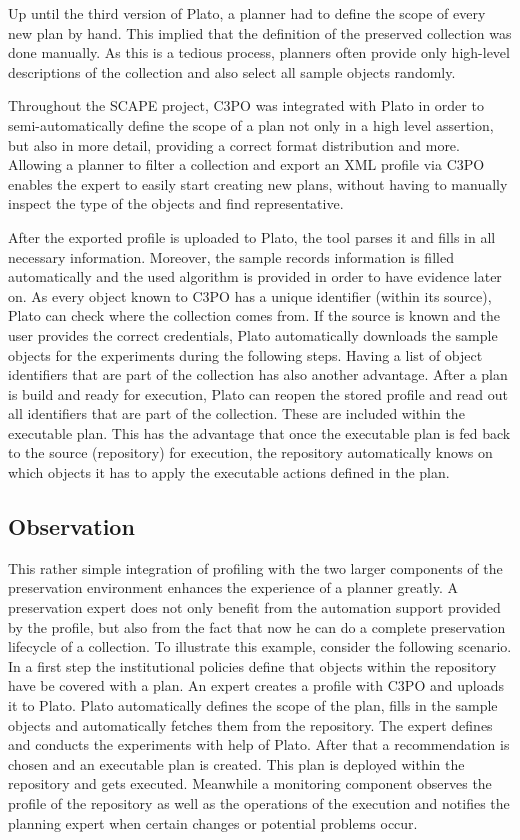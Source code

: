 Up until the third version of Plato, a planner had to define the scope of every new plan by hand. This implied that the definition of the preserved collection was done manually. As this is a tedious process, planners often provide only high-level descriptions of the collection and also select all sample objects randomly.

Throughout the SCAPE project, C3PO was integrated with Plato in order to semi-automatically define the scope of a plan not only in a high level assertion, but also in more detail, providing a correct format distribution and more.
Allowing a planner to filter a collection and export an XML profile via C3PO enables the expert to easily start creating new plans, without having to manually inspect the type of the objects and find representative.

After the exported profile is uploaded to Plato, the tool parses it and fills in all necessary information. Moreover, the sample records information is filled automatically and the used algorithm is provided in order to have evidence later on.
As every object known to C3PO has a unique identifier (within its source), Plato can check where the collection comes from. If the source is known and the user provides the correct credentials, Plato automatically downloads the sample objects for the experiments during the following steps.
Having a list of object identifiers that are part of the collection has also another advantage. After a plan is build and ready for execution, Plato can reopen the stored profile and read out all identifiers that are part of the collection. These are included within the executable plan. This has the advantage that once the executable plan is fed back to the source (repository) for execution, the repository automatically knows on which objects it has to apply the executable actions defined in the plan.

\subsection{Observation}
This rather simple integration of profiling with the two larger components of the preservation environment  enhances the experience of a planner greatly. A preservation expert does not only benefit from the automation support provided by the profile, but also from the fact that now he can do a complete preservation lifecycle of a collection. To illustrate this example, consider the following scenario. In a first step the institutional policies define that objects within the repository have be covered with a plan. An expert creates a profile with C3PO and uploads it to Plato. Plato automatically defines the scope of the plan, fills in the sample objects and automatically fetches them from the repository. The expert defines and conducts the experiments with help of Plato. After that a recommendation is chosen and an executable plan is created. This plan is deployed within the repository and gets executed. Meanwhile a monitoring component observes the profile of the repository as well as the operations of the execution and notifies the planning expert when certain changes or potential problems occur.
